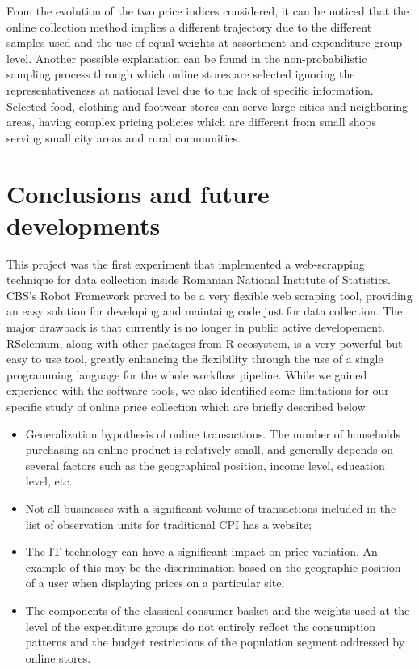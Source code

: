 \documentclass[]{article}
\begin{document}
From the evolution of the two price indices considered, it can be noticed that the online 
collection method implies a different trajectory due to the different samples used and the use 
of equal weights at assortment and expenditure group level. Another possible explanation can be found 
in the non-probabilistic sampling process through which online stores are selected ignoring the 
representativeness at national level due to the lack of specific information. Selected food, 
clothing and footwear stores can serve large cities and neighboring areas, having complex pricing 
policies which are different from small shops serving small city areas and rural communities.


\section{Conclusions and future developments}\label{conclusions}

This project was the first experiment that implemented a web-scrapping technique for data collection 
inside Romanian National Institute of Statistics. CBS's Robot Framework proved to be a very flexible web scraping tool, providing an easy solution
for developing and maintaing code just for data collection. The major drawback is that currently is no longer
in public active developement. RSelenium, along with other packages from R ecosystem, is a very powerful but easy to 
use tool, greatly enhancing the flexibility through the use of a single programming language for the whole workflow pipeline.  
While we gained experience with the software tools, we also 
identified some limitations for our specific study of online price collection which are briefly described below:
\begin{itemize}
\item Generalization hypothesis of online transactions. The number of households purchasing an 
online product is relatively small, and generally depends on several factors such as the geographical position, 
income level, education level, etc.
\item Not all businesses with a significant volume of transactions included in the list of observation 
units for traditional CPI has a website;
\item The IT technology can have a significant impact on price variation. An example of this may be the discrimination 
based on the geographic position of a user when displaying prices on a particular site;
\item The components of the classical consumer basket and the weights used at the level of the expenditure groups do not 
entirely reflect the consumption patterns and the budget restrictions of the population segment addressed by online stores.
\end{itemize}
\end{document}
